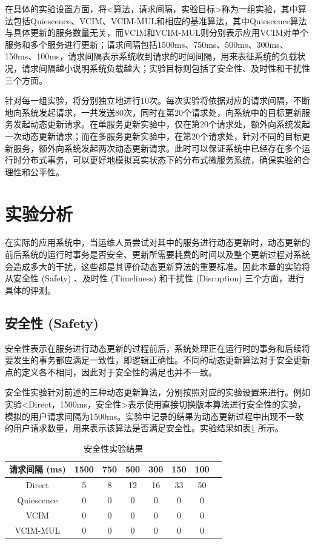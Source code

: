 \documentclass[macfonts,master]{njuthesis}
\begin{document}
在具体的实验设置方面，将<算法，请求间隔，实验目标>称为一组实验，其中算法包括Quiescence、VCIM、VCIM-MUL和相应的基准算法，其中Quiescence算法与具体更新的服务数量无关，而VCIM和VCIM-MUL则分别表示应用VCIM对单个服务和多个服务进行更新；请求间隔包括1500ms、750ms、500ms、300ms、150ms、100ms，请求间隔表示系统收到请求的时间间隔，用来表征系统的负载状况，请求间隔越小说明系统负载越大；实验目标则包括了安全性、及时性和干扰性三个方面。

针对每一组实验，将分别独立地进行10次。每次实验将依据对应的请求间隔，不断地向系统发起请求，一共发送80次，同时在第20个请求处，向系统中的目标更新服务发起动态更新请求。在单服务更新实验中，仅在第20个请求处，额外向系统发起一次动态更新请求；而在多服务更新实验中，在第20个请求处，针对不同的目标更新服务，额外向系统发起两次动态更新请求。此时可以保证系统中已经存在多个运行时分布式事务，可以更好地模拟真实状态下的分布式微服务系统，确保实验的合理性和公平性。

\section{实验分析}
在实际的应用系统中，当运维人员尝试对其中的服务进行动态更新时，动态更新的前后系统的运行时事务是否安全、更新所需要耗费的时间以及整个更新过程对系统会造成多大的干扰，这些都是其评价动态更新算法的重要标准。因此本章的实验将从安全性 (Safety) 、及时性 (Timeliness) 和干扰性 (Disruption) 三个方面，进行具体的评测。

\subsection{安全性 (Safety) }
安全性表示在服务进行动态更新的过程前后，系统处理正在运行时的事务和后续将要发生的事务都应满足一致性，即逻辑正确性。不同的动态更新算法对于安全更新点的定义各不相同，因此对于安全性的满足也并不一致。

安全性实验针对前述的三种动态更新算法，分别按照对应的实验设置来进行。例如实验<Direct，1500ms，安全性>表示使用直接切换版本算法进行安全性的实验，模拟的用户请求间隔为1500ms。实验中记录的结果为动态更新过程中出现不一致的用户请求数量，用来表示该算法是否满足安全性。实验结果如表\ref{table:safety_result} 所示。

\begin{table}
  \centering
  \begin{tabular}{c|c|c|c|c|c|cp{20mm}}
    \hline
    \textbf{请求间隔 (ms) } & 1500 & 750 & 500 & 300 & 150 & 100 \\
    \midrule
    \hline
    Direct  & 5 &  8  & 12 & 16 & 33 & 50 \\
    \hline
    Quiescence     & 0  &  0  & 0 & 0 & 0 & 0 \\
    \hline
    VCIM     & 0 & 0 & 0 & 0 & 0 & 0 \\
    \hline
    VCIM-MUL     & 0 & 0 & 0 & 0 & 0 & 0 \\
    \hline
  \end{tabular}
  \caption{安全性实验结果}
  \label{table:safety_result}
\end{table}
\end{document}
